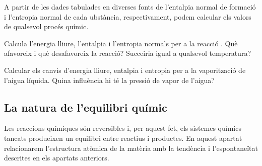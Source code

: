 A partir de les dades tabulades en diverses fonts de l'entalpia normal de formació i l'entropia normal de cada ubstància, respectivament, podem calcular els valors de qualsevol procés químic.
\begin{exr}
Calcula l'energia lliure, l'entalpia i l'entropia normals per a la reacció . Què afavoreix i què desafavoreix la reacció? Succeiria igual a qualsevol temperatura?
\end{exr}

\begin{exr}
Calcular els canvis d'energia lliure, entalpia i entropia per a la vaporització de l'aigua líquida. Quina influència hi té la pressió de vapor de l'aigua?
\end{exr}

\subsection{La natura de l'equilibri químic}

Les reaccions químiques són reversibles i, per aquest fet, els sistemes químics tancats produeixen un equilibri entre reactius i productes.
En aquest apartat relacionarem l'estructura atòmica de la matèria amb la tendència i l'espontaneïtat descrites en els apartats anteriors.

